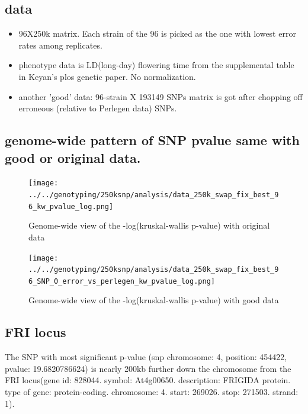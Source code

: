 \documentclass[a4paper,10pt]{article}
\begin{document}
\subsection{data}
\begin{itemize}
 \item 96X250k matrix. Each strain of the 96 is picked as the one with lowest error rates among replicates.
 \item phenotype data is LD(long-day) flowering time from the supplemental table in Keyan's plos genetic paper. No normalization.
 \item another 'good' data: 96-strain X 193149 SNPs matrix is got after chopping off erroneous (relative to Perlegen data) SNPs.
\end{itemize}

\subsection{genome-wide pattern of SNP pvalue same with good or original data.}

\begin{figure}
\texttt{[image: ../../genotyping/250ksnp/analysis/data\_250k\_swap\_fix\_best\_96\_kw\_pvalue\_log.png]}
\caption{Genome-wide view of the -log(kruskal-wallis p-value) with original data}\label{f33}
\end{figure}

\begin{figure}
\texttt{[image: ../../genotyping/250ksnp/analysis/data\_250k\_swap\_fix\_best\_96\_SNP\_0\_error\_vs\_perlegen\_kw\_pvalue\_log.png]}
\caption{Genome-wide view of the -log(kruskal-wallis p-value) with good data}\label{f30}
\end{figure}


\subsection{FRI locus}
The SNP with most significant p-value (snp chromosome: 4, position: 454422, pvalue: 19.6820786624) is nearly 200kb further down the chromosome from the FRI locus(gene id: 828044. symbol: At4g00650. description: FRIGIDA protein. type of gene: protein-coding. chromosome: 4. start: 269026. stop: 271503. strand: 1).
\end{document}

